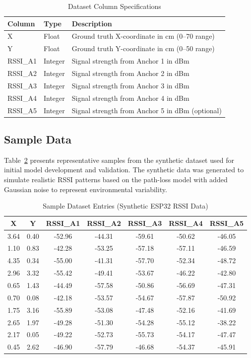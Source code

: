 \begin{table}[H]
\centering
\caption{Dataset Column Specifications}
\label{tab:dataset_columns}
\begin{tabular}{|l|l|p{7cm}|}
\hline
\textbf{Column} & \textbf{Type} & \textbf{Description} \\
\hline
X & Float & Ground truth X-coordinate in cm (0--70 range) \\
Y & Float & Ground truth Y-coordinate in cm (0--50 range) \\
RSSI\_A1 & Integer & Signal strength from Anchor 1 in dBm \\
RSSI\_A2 & Integer & Signal strength from Anchor 2 in dBm \\
RSSI\_A3 & Integer & Signal strength from Anchor 3 in dBm \\
RSSI\_A4 & Integer & Signal strength from Anchor 4 in dBm \\
RSSI\_A5 & Integer & Signal strength from Anchor 5 in dBm (optional) \\
\hline
\end{tabular}
\end{table}

\subsection{Sample Data}

Table~\ref{tab:sample_data} presents representative samples from the synthetic dataset used for initial model development and validation. The synthetic data was generated to simulate realistic RSSI patterns based on the path-loss model with added Gaussian noise to represent environmental variability.

\begin{table}[H]
\centering
\caption{Sample Dataset Entries (Synthetic ESP32 RSSI Data)}
\label{tab:sample_data}
\begin{tabular}{|c|c|c|c|c|c|c|}
\hline
\textbf{X} & \textbf{Y} & \textbf{RSSI\_A1} & \textbf{RSSI\_A2} & \textbf{RSSI\_A3} & \textbf{RSSI\_A4} & \textbf{RSSI\_A5} \\
\hline
3.64 & 0.40 & -52.96 & -44.31 & -59.61 & -50.62 & -46.05 \\
1.10 & 0.83 & -42.28 & -53.25 & -57.18 & -57.11 & -46.59 \\
4.35 & 0.34 & -55.00 & -41.31 & -57.70 & -52.34 & -48.72 \\
2.96 & 3.32 & -55.42 & -49.41 & -53.67 & -46.22 & -42.80 \\
0.65 & 1.43 & -44.49 & -57.58 & -50.86 & -56.69 & -47.31 \\
0.70 & 0.08 & -42.18 & -53.57 & -54.67 & -57.87 & -50.92 \\
1.75 & 3.16 & -55.89 & -53.08 & -47.48 & -52.16 & -41.69 \\
2.65 & 1.97 & -49.28 & -51.30 & -54.28 & -55.12 & -38.22 \\
2.17 & 0.05 & -49.22 & -52.73 & -55.73 & -54.17 & -47.47 \\
0.45 & 2.62 & -46.90 & -57.79 & -46.68 & -54.37 & -45.91 \\
\hline
\end{tabular}
\end{table}

